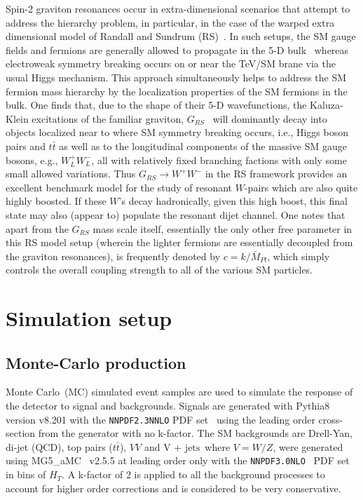 \documentclass[a4paper,11pt]{article}
\newcommand*{\hht}{\ensuremath{H_{\ensuremath{T}}}}
\newcommand*{\vj}{\ensuremath{\text{V + jets}}}
\newcommand*{\ttbar}{\ensuremath{t\bar{t}}}
\newcommand*{\MGAMC}{\textsc{MG5}\_aMC}
\newcommand{\py}{{\sc Pythia8}}
\newcommand*{\pdf}[1]{\texttt{#1}}
\begin{document}
Spin-2 graviton resonances occur in extra-dimensional scenarios that attempt to address the hierarchy problem, in particular, in the case of the warped extra dimensional model of
Randall and Sundrum (RS)~\cite{Randall:1999ee}. In such setups, the SM gauge fields and fermions are generally allowed to propagate in the 5-D
bulk~\cite{Pomarol:1999ad,Davoudiasl:1999tf,Grossman:1999ra,Davoudiasl:2000wi,Gherghetta:2000qt} whereas electroweak symmetry breaking occurs on or near the TeV/SM brane
via the usual Higgs mechanism. This approach simultaneously helps to address the SM fermion mass hierarchy by the localization properties of the SM fermions in the bulk.
One finds that, due to the shape of their 5-D wavefunctions, the Kaluza-Klein excitations of the familiar graviton, $G_{RS}$~\cite{Davoudiasl:1999jd} will dominantly decay into
objects localized near to where SM symmetry breaking occurs, i.e., Higgs boson pairs and $t\bar t$ as well as to the longitudinal components of the massive SM gauge bosons, e.g.,
$W^+_L W^-_L$, all with relatively fixed branching factions with only some small allowed variations. Thus $G_{RS}\rightarrow
W^+W^-$ in the RS framework provides an excellent benchmark model for the study of resonant $W$-pairs which are also quite highly boosted. If these $W$'s decay hadronically,
given this high boost, this final state may also (appear to) populate the resonant dijet channel. One notes that apart from the $G_{RS}$ mass scale itself, essentially the only other
free parameter in this RS model setup (wherein the lighter fermions are essentially decoupled from the graviton resonances), is frequently denoted by $c=k/\bar M_{Pl}$, which simply
controls the overall coupling strength to all of the various SM particles.


\section{Simulation setup}
\label{sec:simulation}

\subsection{Monte-Carlo production}
\label{subsec:mcprod}

Monte Carlo~(MC) simulated event samples are used to simulate the response of the detector to signal and backgrounds. Signals are generated with \py~\cite{Sjostrand:2014zea} version v8.201 with the \pdf{NNPDF2\!.\!3NNLO} PDF set~\cite{Ball:2014uwa} using the leading order cross-section from the generator with no k-factor. The SM backgrounds are Drell-Yan, di-jet (QCD), top pairs (\ttbar), $VV$ and \vj\ where $V=W/Z$,  were generated using \MGAMC~\cite{Alwall:2014hca} v2.5.5 at leading order only with the \pdf{NNPDF3\!.\!0NLO}~\cite{Ball:2014uwa} PDF set in bins of $\hht$. A k-factor of 2 is applied to all the background processes to account for higher order corrections and is considered to be very conservative.
\end{document}
